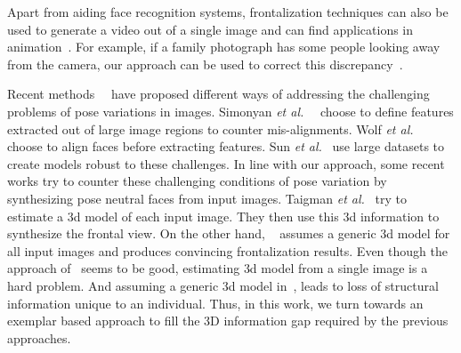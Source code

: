 Apart from aiding face recognition systems, frontalization techniques can also be used to generate a video out of a single image 
and can find applications in animation~\cite{conf/fgr/SaragihLC11a}. For example, if a family photograph has some people 
looking away from the camera, our approach can be used to correct this discrepancy~\cite{Oh:2001:IMP:383259.383310}. 

Recent methods~\cite{SunWT14}~\cite{surpassing_human} have proposed different ways of addressing the
challenging problems of pose variations in images. Simonyan {\em et al.}~\cite{surpassing_human}~\cite{simonyan13fisher}
choose to define features extracted out of large image regions to counter
mis-alignments. Wolf {\em et al.}~\cite{HuangJL07}~\cite{Wolf} choose to align faces before extracting
features. Sun {\em et al.}~\cite{HuLT14} use large datasets to create models robust to these
challenges. In line with our approach, some recent works try to counter these challenging conditions of pose variation by
synthesizing pose neutral faces from input images. Taigman {\em et al.}~\cite{Taigman_2014_CVPR}
try to estimate a {\sc 3d} model of each input image. They then  use this {\sc 3d} information to synthesize
the frontal view. On the other hand, ~\cite{DBLP:journals/corr/HassnerHPE14} assumes a generic {\sc 3d} model for
all input images and produces convincing frontalization results. Even though the approach of~\cite{Taigman_2014_CVPR} seems to be good, estimating {\sc 3d} model from a single image is a hard problem. And assuming a generic {\sc 3d} model in~\cite{DBLP:journals/corr/HassnerHPE14}, leads to loss of structural information unique to an individual.
 Thus, in this work, we turn towards an exemplar based approach to fill the {\sc 3D} information gap 
required by the previous approaches. 


